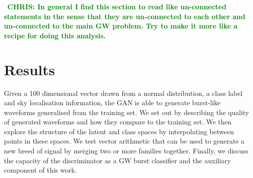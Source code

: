 \documentclass[12pt]{iopart}
\newcommand{\chris}[1]{\textbf{\textcolor{green}{CHRIS: #1}}}
\begin{document}

~\chris{In general I find this section to read like un-connected statements in
the sense that they are un-connected to each other and un-connected to the main
GW problem. Try to make it more like a recipe for doing this analysis.}

\section{Results}

Given a 100 dimensional vector drawn from a normal distribution, a class label and sky localisation information, the GAN is able to generate burst-like waveforms  generalised from the training set. We set out by describing the quality of generated waveforms and how they compare to the training set. We then explore the structure of the latent and class spaces by interpolating between points in these spaces. We test vector arithmetic that can be used to generate a new breed of signal by merging two or more families together. Finally, we discuss the capacity of the discriminator as a \ac{GW} burst classifier and the auxiliary component of this work. 
\end{document}
